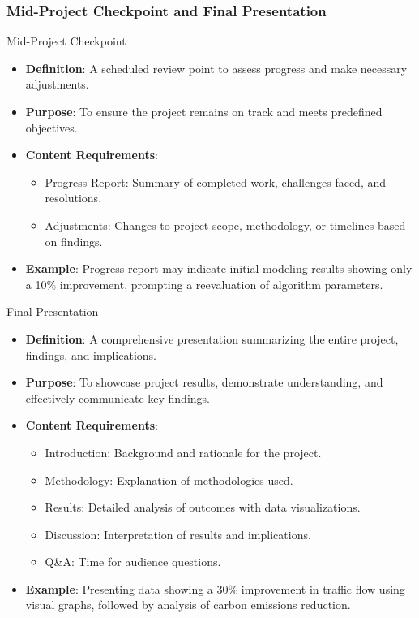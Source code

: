 \documentclass[aspectratio=169]{beamer}
\begin{document}
\begin{frame}[fragile]
    \frametitle{Mid-Project Checkpoint and Final Presentation}
    \begin{block}{Mid-Project Checkpoint}
        \begin{itemize}
            \item \textbf{Definition}: A scheduled review point to assess progress and make necessary adjustments.
            \item \textbf{Purpose}: To ensure the project remains on track and meets predefined objectives.
            \item \textbf{Content Requirements}:
                \begin{itemize}
                    \item Progress Report: Summary of completed work, challenges faced, and resolutions.
                    \item Adjustments: Changes to project scope, methodology, or timelines based on findings.
                \end{itemize}
            \item \textbf{Example}: Progress report may indicate initial modeling results showing only a 10\% improvement, prompting a reevaluation of algorithm parameters.
        \end{itemize}
    \end{block}
    
    \begin{block}{Final Presentation}
        \begin{itemize}
            \item \textbf{Definition}: A comprehensive presentation summarizing the entire project, findings, and implications.
            \item \textbf{Purpose}: To showcase project results, demonstrate understanding, and effectively communicate key findings.
            \item \textbf{Content Requirements}:
                \begin{itemize}
                    \item Introduction: Background and rationale for the project.
                    \item Methodology: Explanation of methodologies used.
                    \item Results: Detailed analysis of outcomes with data visualizations.
                    \item Discussion: Interpretation of results and implications.
                    \item Q\&A: Time for audience questions.
                \end{itemize}
            \item \textbf{Example}: Presenting data showing a 30\% improvement in traffic flow using visual graphs, followed by analysis of carbon emissions reduction.
        \end{itemize}
    \end{block}
\end{frame}
\end{document}
